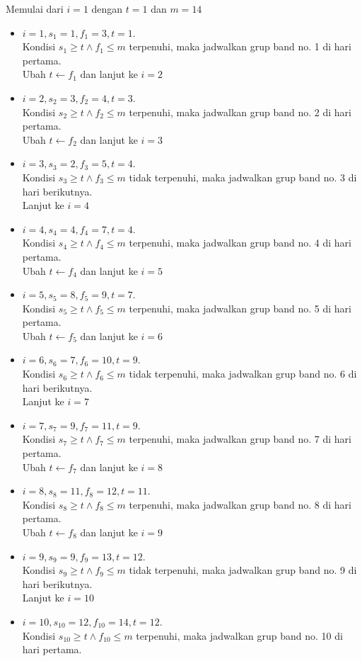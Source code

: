 \documentclass[12pt]{article}
\begin{document}
	\noindent Memulai dari $i = 1$ dengan $t = 1$ dan $m = 14$
	\begin{itemize}
		\item $i = 1, s_{1} = 1, f_{1} = 3, t = 1$.\\Kondisi $s_{1} \geq t \land f_{1} \leq m$ terpenuhi, maka jadwalkan grup band no. 1 di hari pertama.\\Ubah $t \gets f_1$ dan lanjut ke $i = 2$
		\item $i = 2, s_{2} = 3, f_{2} = 4, t = 3$.\\Kondisi $s_{2} \geq t \land f_{2} \leq m$ terpenuhi, maka jadwalkan grup band no. 2 di hari pertama.\\Ubah $t \gets f_2$ dan lanjut ke $i = 3$
		\item $i = 3, s_{3} = 2, f_{3} = 5, t = 4$.\\Kondisi $s_{3} \geq t \land f_{3} \leq m$ tidak terpenuhi, maka jadwalkan grup band no. 3 di hari berikutnya.\\Lanjut ke $i = 4$
		\item $i = 4, s_{4} = 4, f_{4} = 7, t = 4$.\\Kondisi $s_{4} \geq t \land f_{4} \leq m$ terpenuhi, maka jadwalkan grup band no. 4 di hari pertama.\\Ubah $t \gets f_4$ dan lanjut ke $i = 5$
		\item $i = 5, s_{5} = 8, f_{5} = 9, t = 7$.\\Kondisi $s_{5} \geq t \land f_{5} \leq m$ terpenuhi, maka jadwalkan grup band no. 5 di hari pertama.\\Ubah $t \gets f_5$ dan lanjut ke $i = 6$
		\item $i = 6, s_{6} = 7, f_{6} = 10, t = 9$.\\Kondisi $s_{6} \geq t \land f_{6} \leq m$ tidak terpenuhi, maka jadwalkan grup band no. 6 di hari berikutnya.\\Lanjut ke $i = 7$
		\item $i = 7, s_{7} = 9, f_{7} = 11, t = 9$.\\Kondisi $s_{7} \geq t \land f_{7} \leq m$ terpenuhi, maka jadwalkan grup band no. 7 di hari pertama.\\Ubah $t \gets f_7$ dan lanjut ke $i = 8$
		\item $i = 8, s_{8} = 11, f_{8} = 12, t = 11$.\\Kondisi $s_{8} \geq t \land f_{8} \leq m$ terpenuhi, maka jadwalkan grup band no. 8 di hari pertama.\\Ubah $t \gets f_8$ dan lanjut ke $i = 9$
		\item $i = 9, s_{9} = 9, f_{9} = 13, t = 12$.\\Kondisi $s_{9} \geq t \land f_{9} \leq m$ tidak terpenuhi, maka jadwalkan grup band no. 9 di hari berikutnya.\\Lanjut ke $i = 10$
		\item $i = 10, s_{10} = 12, f_{10} = 14, t = 12$.\\Kondisi $s_{10} \geq t \land f_{10} \leq m$ terpenuhi, maka jadwalkan grup band no. 10 di hari pertama.
	\end{itemize}
	
\end{document}
